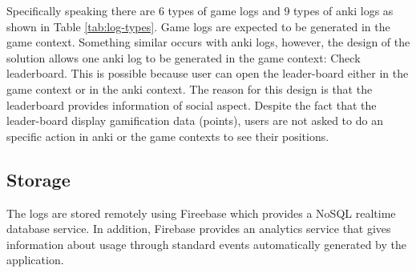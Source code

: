 Specifically speaking there are 6 types of game logs and 9 types of anki logs as shown in Table \ref{tab:log-types}. Game logs are expected to be generated in the game context. Something similar occurs with anki logs, however, the design of the solution allows one anki log to be generated in the game context: Check leaderboard. This is possible because user can open the leader-board either in the game context or in the anki context. The reason for this design is that the leaderboard provides information of social aspect. Despite the fact that the leader-board display gamification data (points), users are not asked to do an specific action in anki or the game contexts to see their positions.

\subsection{Storage}
The logs are stored remotely using Fireebase which provides a NoSQL realtime database service. In addition, Firebase provides an analytics service that gives information about usage through standard events automatically generated by the application.
